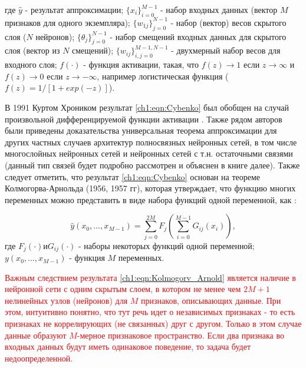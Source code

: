 \documentclass[12pt]{article}
\begin{document}
\begin{sloppypar}
где $\hat y$ - результат аппроксимации; 
$\{x_i\}_{i=0}^{M-1}$ - набор входных данных (вектор $M$ признаков для одного экземпляра); 
$ \{ w_{1j} \}_{j=0}^{N-1}$ - набор (вектор) весов скрытого слоя ($N$ нейронов); 
$\{ \theta_j \}_{j=0}^{N-1}$ - набор смещений входных данных для скрытого слоя (вектор из $N$ смещений); 
$\{ w_{ij} \}_{i,j=0}^{M-1,N-1}$ - двухмерный набор весов для входного слоя; 
$f(\cdot)$ - функция активации, такая, что $f(z)\to 1$ если $z \to \infty$ и $f(z)\to 0$ если $z \to -\infty$, например логистическая функция ($f(z) = 1/[1+exp(-z)]$).

В 1991 Куртом Хроником  результат \ref{ch1:eqn:Cybenko} был обобщен на случай произвольной дифференцируемой функции активации \cite{hornik1991approximation}. Также рядом авторов были приведены доказательства универсальная теорема аппроксимации для других частных случаев архитектур полносвязных нейронных сетей, в том числе многослойных нейронных сетей \cite{kidger2020universal} и нейронных сетей с т.н. остаточными связями \cite {tabuada2020universal} (данный тип связей будет подробно рассмотрен и объяснен в книге далее). Также следует отметить, что результат \ref{ch1:eqn:Cybenko} основан на теореме Колмогорва-Арнольда (1956, 1957 гг), которая утверждает, что функцию многих переменных можно представить в виде набора функций одной переменной, как \cite{Arnold1957variables3, Kolmogorov1957representation}:

\begin{equation}
\label{ch1:eqn:Kolmogorv_Arnold}
\hat y(x_0,...,x_{M-1}) = \sum_{j=0}^{2M} F_j(\sum_{i=0}^{M-1}G_{ij}(x_i)) ,
\end{equation}
где $F_j(\cdot) и G_{ij}(\cdot)$ - наборы некоторых функций одной переменной; $y(x_0,...,x_{M-1})$ - функция $M$ переменных. 

\textcolor{red}{Важным следствием результата \ref{ch1:eqn:Kolmogorv_Arnold} является наличие в нейронной сети с одним скрытым слоем, в котором не менее чем $2M+1$ нелинейных узлов (нейронов) для $M$ признаков, описывающих данные. При этом, интуитивно понятно, что тут речь идет о независимых признаках - то есть признаках не коррелирующих (не связанных) друг с другом. Только в этом случае данные образуют  $M$-мерное признаковое пространство. Если два признака во входных данных будут иметь одинаковое поведение, то задача будет недоопределенной. }
 

\end{sloppypar}
\end{document}
